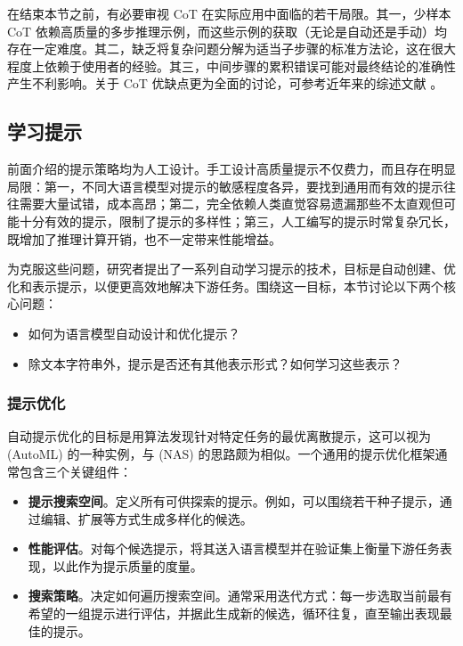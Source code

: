 在结束本节之前，有必要审视 CoT 在实际应用中面临的若干局限。其一，少样本 CoT 依赖高质量的多步推理示例，而这些示例的获取（无论是自动还是手动）均存在一定难度。其二，缺乏将复杂问题分解为适当子步骤的标准方法论，这在很大程度上依赖于使用者的经验。其三，中间步骤的累积错误可能对最终结论的准确性产生不利影响。关于 CoT 优缺点更为全面的讨论，可参考近年来的综述文献 \cite{chu-etal:2023survey,yu-etal:2023towards,zhang-etal:2023igniting}。

\subsection{学习提示}
\label{sec:learning-prompts}

\noindent 前面介绍的提示策略均为人工设计。手工设计高质量提示不仅费力，而且存在明显局限：第一，不同大语言模型对提示的敏感程度各异，要找到通用而有效的提示往往需要大量试错，成本高昂；第二，完全依赖人类直觉容易遗漏那些不太直观但可能十分有效的提示，限制了提示的多样性；第三，人工编写的提示时常复杂冗长，既增加了推理计算开销，也不一定带来性能增益。

为克服这些问题，研究者提出了一系列自动学习提示的技术，目标是自动创建、优化和表示提示，以便更高效地解决下游任务。围绕这一目标，本节讨论以下两个核心问题：

\begin{itemize}
\item 如何为语言模型自动设计和优化提示？
\item 除文本字符串外，提示是否还有其他表示形式？如何学习这些表示？
\end{itemize}

\subsubsection{提示优化}
\label{sec:prompt-optimization}

\noindent 自动提示优化的目标是用算法发现针对特定任务的最优离散提示，这可以视为 (AutoML) 的一种实例，与 (NAS) 的思路颇为相似。一个通用的提示优化框架通常包含三个关键组件：

\begin{itemize}
\item \textbf{提示搜索空间}。定义所有可供探索的提示。例如，可以围绕若干种子提示，通过编辑、扩展等方式生成多样化的候选。
\item \textbf{性能评估}。对每个候选提示，将其送入语言模型并在验证集上衡量下游任务表现，以此作为提示质量的度量。
\item \textbf{搜索策略}。决定如何遍历搜索空间。通常采用迭代方式：每一步选取当前最有希望的一组提示进行评估，并据此生成新的候选，循环往复，直至输出表现最佳的提示。
\end{itemize}

